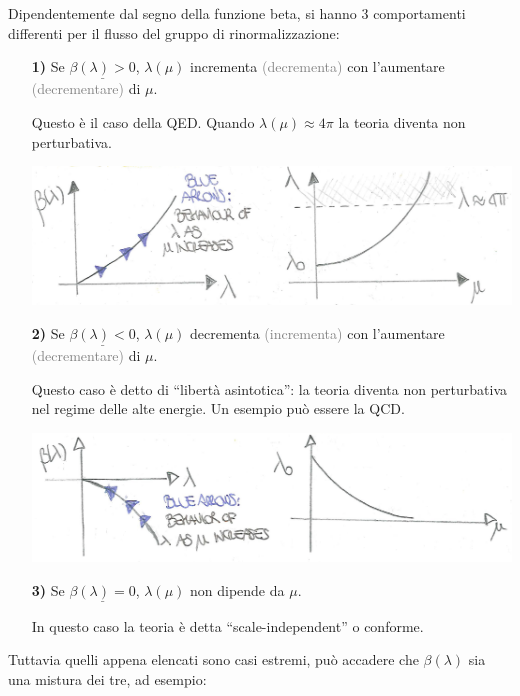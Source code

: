 \documentclass[../main.tex]{subfiles}
\begin{document}
Dipendentemente dal segno della funzione beta, si hanno 3 comportamenti differenti per il flusso del gruppo di rinormalizzazione:
\begin{enumerate}
    \item[\textbf{1)}] Se \(\underline{\beta(\lambda) > 0}\), \(\lambda(\mu)\) incrementa \textcolor{Gray}{(decrementa)} con l'aumentare \textcolor{Gray}{(decrementare)} di $\mu$.

    Questo è il caso della QED. Quando \(\lambda(\mu)\approx 4\pi\) la teoria diventa non perturbativa.
    
    \includegraphics[]{images_ch5/beta_case1.jpg}
    
    \item[\textbf{2)}] Se \(\underline{\beta(\lambda) < 0}\), \(\lambda(\mu)\) decrementa \textcolor{Gray}{(incrementa)} con l'aumentare \textcolor{Gray}{(decrementare)} di $\mu$.


    Questo caso è detto di “libertà asintotica”: la teoria diventa non perturbativa nel regime delle alte energie. Un esempio può essere la QCD.
    
    \includegraphics[]{images_ch5/beta_case2.jpg}
    
    \item[\textbf{3)}] Se \(\underline{\beta(\lambda) = 0}\), \(\lambda(\mu)\) non dipende da $\mu$.

    In questo caso la teoria è detta “scale-independent” o conforme.
\end{enumerate}

Tuttavia quelli appena elencati sono casi estremi, può accadere che $\beta(\lambda)$ sia una mistura dei tre, ad esempio:
\end{document}
